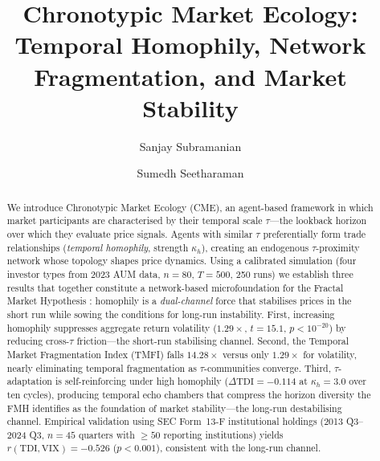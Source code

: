 \documentclass[preprint,12pt,authoryear]{elsarticle}
\begin{document}
\linenumbers

\begin{frontmatter}

\title{Chronotypic Market Ecology: Temporal Homophily,
       Network Fragmentation, and Market Stability}

\author[vchs]{Sanjay Subramanian}

\author[vchs]{Sumedh Seetharaman}



\begin{abstract}
We introduce Chronotypic Market Ecology (CME), an agent-based framework
in which market participants are characterised by their temporal scale
$\tau$---the lookback horizon over which they evaluate price signals.
Agents with similar $\tau$ preferentially form trade relationships
(\emph{temporal homophily}, strength $\kappa_h$), creating an endogenous
$\tau$-proximity network whose topology shapes price dynamics.
Using a calibrated simulation (four investor types from 2023 AUM data,
$n = 80$, $T = 500$, 250 runs) we establish three results that together
constitute a network-based microfoundation for the Fractal Market
Hypothesis \citep{peters1994}: homophily is a \emph{dual-channel} force
that stabilises prices in the short run while sowing the conditions for
long-run instability.
First, increasing homophily suppresses aggregate return volatility
($1.29\times$, $t = 15.1$, $p < 10^{-20}$) by reducing cross-$\tau$
friction---the short-run stabilising channel.
Second, the Temporal Market Fragmentation Index (TMFI) falls $14.28\times$
versus only $1.29\times$ for volatility, nearly eliminating temporal
fragmentation as $\tau$-communities converge.
Third, $\tau$-adaptation is self-reinforcing under high homophily
($\Delta\mathrm{TDI} = -0.114$ at $\kappa_h = 3.0$ over ten cycles),
producing temporal echo chambers that compress the horizon diversity the
FMH identifies as the foundation of market stability---the long-run
destabilising channel.
Empirical validation using SEC Form~13-F institutional holdings
(2013 Q3--2024 Q3, $n = 45$ quarters with $\geq 50$ reporting
institutions) yields $r(\mathrm{TDI}, \mathrm{VIX}) = -0.526$
($p < 0.001$), consistent with the long-run channel.
\end{abstract}


\end{frontmatter}
\end{document}
